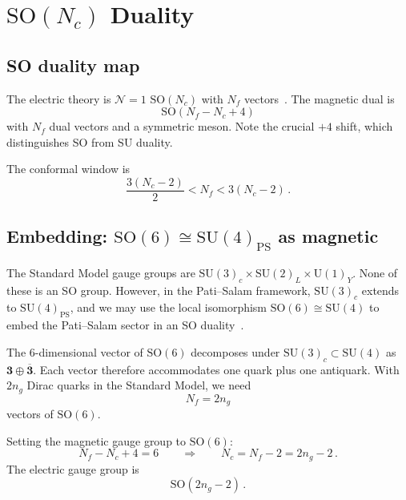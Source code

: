 \documentclass[11pt,a4paper]{article}
\theoremstyle{plain}
\theoremstyle{definition}
\theoremstyle{remark}
\newcommand{\Nc}{N_{\!c}}
\newcommand{\Nf}{N_{\!f}}
\newcommand{\ngen}{n_g}
\newcommand{\SU}[1]{\mathrm{SU}(#1)}
\newcommand{\UU}[1]{\mathrm{U}(#1)}
\newcommand{\SO}[1]{\mathrm{SO}(#1)}
\begin{document}
\section{$\SO{\Nc}$ Duality}
\label{sec:SO-duality}

\subsection{SO duality map}

The electric theory is $\mathcal{N}=1$ $\SO{\Nc}$ with $\Nf$
vectors~\cite{IS9506101}.  The magnetic dual is
\begin{equation}\label{eq:SO-dual}
  \SO{\Nf - \Nc + 4}
\end{equation}
with $\Nf$ dual vectors and a symmetric meson.  Note the crucial
$+4$ shift, which distinguishes SO from SU duality.

The conformal window is
\begin{equation}\label{eq:SO-CW}
  \frac{3(\Nc - 2)}{2} < \Nf < 3(\Nc - 2)\,.
\end{equation}

\subsection{Embedding: $\SO{6} \cong \SU{4}_{\mathrm{PS}}$ as magnetic}

The Standard Model gauge groups are $\SU{3}_c \times \SU{2}_L
\times \UU{1}_Y$.  None of these is an SO group.  However, in the
Pati--Salam framework, $\SU{3}_c$ extends to $\SU{4}_{\mathrm{PS}}$,
and we may use the local isomorphism
$\SO{6} \cong \SU{4}$ to embed the Pati--Salam sector in an SO
duality~\cite{IS9506101,PS1974}.

The 6-dimensional vector of $\SO{6}$ decomposes under
$\SU{3}_c \subset \SU{4}$ as $\mathbf{3} \oplus \overline{\mathbf{3}}$.
Each vector therefore accommodates one quark plus one antiquark.  With
$2\ngen$ Dirac quarks in the Standard Model, we need
\begin{equation}
  \Nf = 2\ngen
\end{equation}
vectors of $\SO{6}$.

Setting the magnetic gauge group to $\SO{6}$:
\begin{equation}
  \Nf - \Nc + 4 = 6
  \qquad\Longrightarrow\qquad
  \Nc = \Nf - 2 = 2\ngen - 2\,.
\end{equation}
The electric gauge group is
\begin{equation}\label{eq:SO-electric}
  \boxed{\SO{2\ngen - 2}}\,.
\end{equation}
\end{document}
